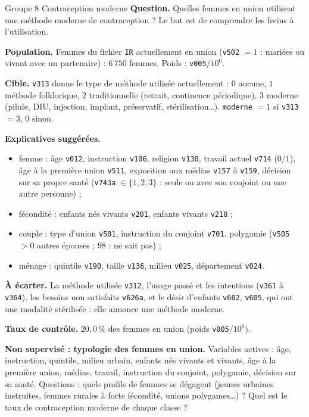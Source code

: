 \documentclass[11pt]{article}
\begin{document}
\begin{fiche}{Groupe 8 \textendash{} Contraception moderne}
\textbf{Question.} Quelles femmes en union utilisent une méthode moderne de contraception ? Le but est de comprendre les freins à l'utilisation.

\textbf{Population.} Femmes du fichier \texttt{IR} actuellement en union (\texttt{v502} $=1$ : mariées ou vivant avec un partenaire) : $6\,750$ femmes. Poids : \texttt{v005}/$10^6$.

\textbf{Cible.} \texttt{v313} donne le type de méthode utilisée actuellement : $0$ aucune, $1$ méthode folklorique, $2$ traditionnelle (retrait, continence périodique), $3$ moderne (pilule, DIU, injection, implant, préservatif, stérilisation\dots). \texttt{moderne} $=1$ si \texttt{v313} $=3$, $0$ sinon.

\textbf{Explicatives suggérées.}
\begin{itemize}
  \item femme : âge \texttt{v012}, instruction \texttt{v106}, religion \texttt{v130}, travail actuel \texttt{v714} ($0/1$), âge à la première union \texttt{v511}, exposition aux médias \texttt{v157} à \texttt{v159}, décision sur sa propre santé (\texttt{v743a} $\in\{1,2,3\}$ : seule ou avec son conjoint ou une autre personne) ;
  \item fécondité : enfants nés vivants \texttt{v201}, enfants vivants \texttt{v218} ;
  \item couple : type d'union \texttt{v501}, instruction du conjoint \texttt{v701}, polygamie (\texttt{v505} $>0$ autres épouses ; $98$ : ne sait pas) ;
  \item ménage : quintile \texttt{v190}, taille \texttt{v136}, milieu \texttt{v025}, département \texttt{v024}.
\end{itemize}

\textbf{À écarter.} La méthode utilisée \texttt{v312}, l'usage passé et les intentions (\texttt{v361} à \texttt{v364}), les besoins non satisfaits \texttt{v626a}, et le désir d'enfants \texttt{v602}, \texttt{v605}, qui ont une modalité \og stérilisée \fg{} : elle annonce une méthode moderne.

\textbf{Taux de contrôle.} $20{,}0\,\%$ des femmes en union (poids \texttt{v005}/$10^6$).

\textbf{Non supervisé : typologie des femmes en union.} Variables actives : âge, instruction, quintile, milieu urbain, enfants nés vivants et vivants, âge à la première union, médias, travail, instruction du conjoint, polygamie, décision sur sa santé. Questions : quels profils de femmes se dégagent (jeunes urbaines instruites, femmes rurales à forte fécondité, unions polygames\dots) ? Quel est le taux de contraception moderne de chaque classe ?
\end{fiche}

\end{document}
